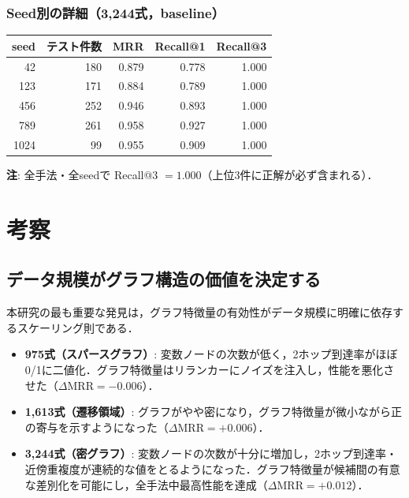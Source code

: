 \documentclass[11pt,a4paper]{ltjsarticle}
\begin{document}
\subsubsection{Seed別の詳細（3,244式，baseline）}

\begin{table}[h]
\centering
\begin{tabular}{rrrrr}
\toprule
seed & テスト件数 & MRR & Recall@1 & Recall@3 \\
\midrule
42 & 180 & 0.879 & 0.778 & 1.000 \\
123 & 171 & 0.884 & 0.789 & 1.000 \\
456 & 252 & 0.946 & 0.893 & 1.000 \\
789 & 261 & 0.958 & 0.927 & 1.000 \\
1024 & 99 & 0.955 & 0.909 & 1.000 \\
\bottomrule
\end{tabular}
\end{table}

\noindent\textbf{注}: 全手法・全seedで Recall@3 $= 1.000$（上位3件に正解が必ず含まれる）．

\section{考察}

\subsection{データ規模がグラフ構造の価値を決定する}

本研究の最も重要な発見は，グラフ特徴量の有効性がデータ規模に明確に依存するスケーリング則である．

\begin{itemize}
  \item \textbf{975式（スパースグラフ）}: 変数ノードの次数が低く，2ホップ到達率がほぼ0/1に二値化．グラフ特徴量はリランカーにノイズを注入し，性能を悪化させた（$\Delta\mathrm{MRR} = -0.006$）．
  \item \textbf{1,613式（遷移領域）}: グラフがやや密になり，グラフ特徴量が微小ながら正の寄与を示すようになった（$\Delta\mathrm{MRR} = +0.006$）．
  \item \textbf{3,244式（密グラフ）}: 変数ノードの次数が十分に増加し，2ホップ到達率・近傍重複度が連続的な値をとるようになった．グラフ特徴量が候補間の有意な差別化を可能にし，全手法中最高性能を達成（$\Delta\mathrm{MRR} = +0.012$）．
\end{itemize}
\end{document}
